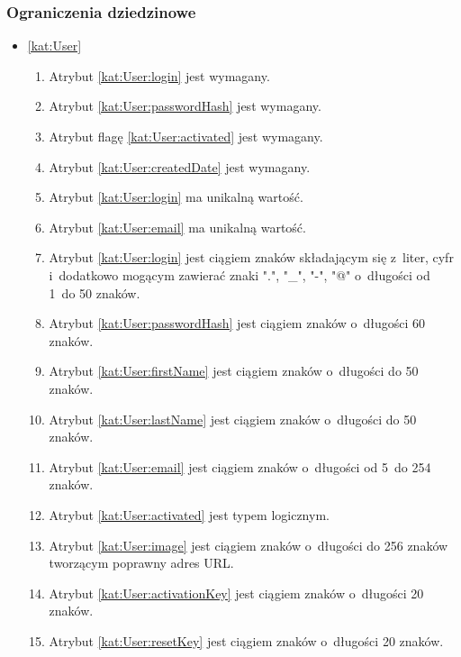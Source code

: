 \subsubsection{Ograniczenia dziedzinowe}\label{subsubsec:database:gateway:restrictions}

\begin{itemize}[label={\textbf{Ograniczenia dla}}, wide, labelwidth=!, labelindent=0pt]
    \setlength\itemsep{1.75em}
    \item\ref{kat:User}\mynobreakpar
    \begin{enumerate}[label={\textbf{OGR/1/\protect\twodigits{\arabic{enumi}}}}, wide, labelwidth=!, align=left, leftmargin=3cm]
        \item Atrybut \ref{kat:User:login} jest wymagany.
        \item Atrybut \ref{kat:User:passwordHash} jest wymagany.
        \item Atrybut flagę \ref{kat:User:activated} jest wymagany.
        \item Atrybut \ref{kat:User:createdDate} jest wymagany.
        \item Atrybut \ref{kat:User:login} ma unikalną wartość.
        \item Atrybut \ref{kat:User:email} ma unikalną wartość.
        \item Atrybut \ref{kat:User:login} jest ciągiem znaków składającym się z~liter, cyfr i~dodatkowo mogącym zawierać znaki ".", "\_", "-", "@" o~długości od 1~do 50 znaków.
        \item Atrybut \ref{kat:User:passwordHash} jest ciągiem znaków o~długości 60 znaków.
        \item Atrybut \ref{kat:User:firstName} jest ciągiem znaków o~długości do 50 znaków.
        \item Atrybut \ref{kat:User:lastName} jest ciągiem znaków o~długości do 50 znaków.
        \item Atrybut \ref{kat:User:email} jest ciągiem znaków o~długości od 5~do 254 znaków.
        \item Atrybut \ref{kat:User:activated} jest typem logicznym.
        \item Atrybut \ref{kat:User:image} jest ciągiem znaków o~długości do 256 znaków tworzącym poprawny adres URL.
        \item Atrybut \ref{kat:User:activationKey} jest ciągiem znaków o~długości 20 znaków.
        \item Atrybut \ref{kat:User:resetKey} jest ciągiem znaków o~długości 20 znaków.

\end{enumerate}
\end{itemize}
